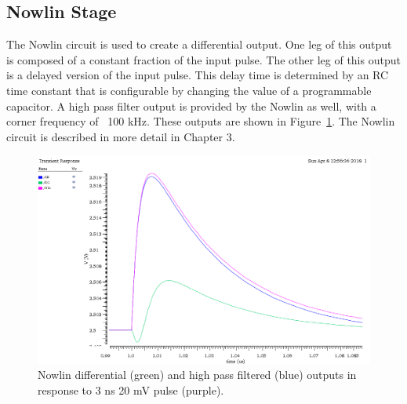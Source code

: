 \documentclass[12pt,oneside,final]{siuethesis}
\theoremstyle{definition}
\begin{document}
\subsection{Nowlin Stage}
\par The Nowlin circuit is used to create a differential output. One leg of this output is composed of a constant fraction of the input pulse. The other leg of this output is a delayed version of the input pulse. This delay time is determined by an RC time constant that is configurable by changing the value of a programmable capacitor. A high pass filter output is provided by the Nowlin as well, with a corner frequency of ~100 kHz. These outputs are shown in Figure~\ref{fig:nowlinout}. The Nowlin circuit is described in more detail in Chapter 3.
\begin{figure}[h]
\centering
\includegraphics[scale=.40,keepaspectratio=true]{images/nowlin_out.png} 
\caption{Nowlin differential (green) and high pass filtered (blue) outputs in response to 3 ns 20 mV pulse (purple). }
\label{fig:nowlinout}
\end{figure}
\end{document}
